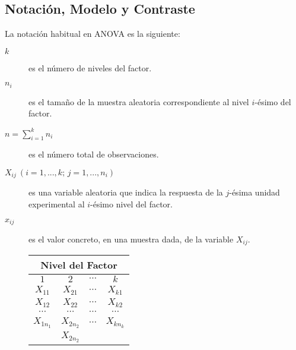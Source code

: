 \subsection{Notación, Modelo y Contraste}
La notación habitual en ANOVA es la siguiente:
\begin{description}
\item[$k$] es el número de niveles del factor.
\item[$n_i$] es el tamaño de la muestra aleatoria correspondiente al nivel $i$-ésimo del factor.
\item[$n = \sum_{i = 1}^k {n_i}$] es el número total de observaciones.
\item[$X_{ij}\ (i = 1,...,k;\,j = 1,...,n_i)$] es una variable aleatoria que indica la respuesta de la $j$-ésima unidad
experimental al $i$-ésimo nivel del factor.
\item [$x_{ij}$] es el valor concreto, en una muestra dada, de la variable $X_{ij}$.

\begin{center}
\begin{tabular}{|l|l|l|l|}
\hline
\multicolumn{4}{|c|}{Nivel del Factor} \\
\hline
\multicolumn{1}{|c|}{$1$} & \multicolumn{1}{c|}{$2$} & \multicolumn{1}{c|}{$\cdots$} & \multicolumn{1}{c|}{$k$} \\
\hline
\multicolumn{1}{|c|}{$X_{11}$} & \multicolumn{1}{c|}{$X_{21}$} & \multicolumn{1}{c|}{$\cdots$} &
\multicolumn{1}{c|}{$X_{k1}$}
\\
\hline
\multicolumn{1}{|c|}{$X_{12}$} & \multicolumn{1}{c|}{$X_{22}$} & \multicolumn{1}{c|}{$\cdots$} & \multicolumn{1}{c|}{$X_{k2}$} \\
\hline
\multicolumn{1}{|c|}{$\cdots$} & \multicolumn{1}{c|}{$\cdots$} & \multicolumn{1}{c|}{$\cdots$} & \multicolumn{1}{c|}{$\cdots$} \\
\hline
\multicolumn{1}{|c|}{$X_{1n_1}$} & \multicolumn{1}{c|}{$X_{2n_2}$} & \multicolumn{1}{c|}{$\cdots$} &
\multicolumn{1}{c|}{$X_{kn_k}$}
\\
\hline
\multicolumn{1}{c|}{} & \multicolumn{1}{c|}{$X_{2n_2}$} & \multicolumn{1}{c}{} & \multicolumn{1}{c}{} \\
\cline{2-2}
\end {tabular}
\end{center}


\end{description}
